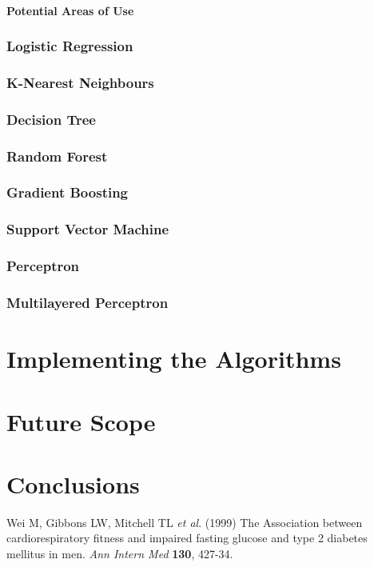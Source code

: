 \documentclass[12pt]{article}
\begin{document}
\subsection{Potential Areas of Use}
\newpage
\section{Logistic Regression}
\newpage
\section{K-Nearest Neighbours}
\newpage
\section{Decision Tree}
\newpage
\section{Random Forest}
\newpage
\section{Gradient Boosting}
\newpage
\section{Support Vector Machine}
\newpage
\section{Perceptron}
\newpage
\section{Multilayered Perceptron}
\newpage
\part{Implementing the Algorithms}
\newpage
\part{Future Scope}
\newpage
\part{Conclusions}
\clearpage

\newpage
\begin{thebibliography}{}

Wei M, Gibbons LW, Mitchell TL \textit{et al}. (1999) The Association between cardiorespiratory fitness and impaired fasting glucose and type 2 diabetes mellitus in men. \textit{Ann Intern Med} \textbf{130}, 427-34.

\end{thebibliography}
\end{document}
